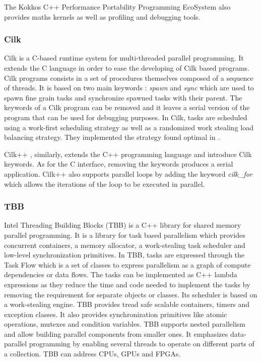 The Kokkos C++ Performance Portability Programming EcoSystem also provides maths kernels as well as profiling and debugging tools.

\subsubsection{Cilk}
Cilk \cite{BJKLR1995} is a C-based runtime system for multi-threaded parallel programming.
It extends the C language in order to ease the developing of Cilk based programs.
Cilk programs consists in a set of procedures themselves composed of a sequence of threads.
It is based on two main keywords : \textit{spawn} and \textit{sync} which are used to spawn fine grain tasks and synchronize spawned tasks with their parent.
The keywords of a Cilk program can be removed and it leaves a serial version of the program that can be used for debugging purposes.
In Cilk, tasks are scheduled using a work-first scheduling strategy as well as a randomized work stealing load balancing strategy.
They implemented the strategy found optimal in \cite{BlumL1999}.

Cilk++ \cite{Leise2009}, similarly, extends the C++ programming language and introduce Cilk keywords.
As for the C interface, removing the keywords produces a serial application.
Cilk++ also supports parallel loops by adding the keyword \textit{cilk\_for} which allows the iterations of the loop to be executed in parallel.

\subsubsection{TBB}
Intel Threading Building Blocks (TBB) \cite{Reind2007} \cite{Pheat2008} is a C++ library for shared memory parallel programming.
It is a library for task based parallelism which provides concurrent containers, a memory allocator, a work-stealing task scheduler and low-level synchronization primitives.
In TBB, tasks are expressed through the Task Flow which is a set of classes to express parallelism as a graph of compute dependencies or data flows.
The tasks can be implemented as C++ lambda expressions as they reduce the time and code needed to implement the tasks by removing the requirement for separate objects or classes.
Its scheduler is based on a work-stealing engine.
TBB provides tread safe scalable containers, timers and exception classes.
It also provides synchronization primitives like atomic operations, mutexes and condition variables.
TBB supports nested parallelism and allow building parallel components from smaller ones.
It emphasizes data-parallel programming by enabling several threads to operate on different parts of a collection.
TBB can address CPUs, GPUs and FPGAs.

